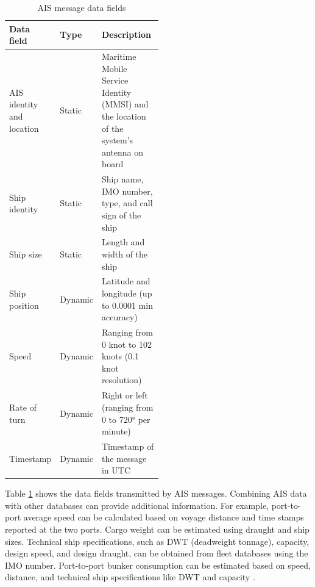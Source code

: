 \begin{table}[ht]
    \centering
    \begin{tabular}{|l|l|p{0.5\linewidth}|}
        \hline
        \textbf{Data field}       & \textbf{Type} & \textbf{Description}                                                                      \\
        \hline
        AIS identity and location & Static        & Maritime Mobile Service Identity (MMSI) and the location of the system's antenna on board \\
        \hline
        Ship identity             & Static        & Ship name, IMO number, type, and call sign of the ship                                    \\
        \hline
        Ship size                 & Static        & Length and width of the ship                                                              \\
        \hline
        Ship position             & Dynamic       & Latitude and longitude (up to 0.0001 min accuracy)                                        \\
        \hline
        Speed                     & Dynamic       & Ranging from 0 knot to 102 knots (0.1 knot resolution)                                    \\
        \hline
        Rate of turn              & Dynamic       & Right or left (ranging from 0 to 720° per minute)                                         \\
        \hline
        Timestamp                 & Dynamic       & Timestamp of the message in UTC                                                           \\
        \hline
    \end{tabular}
    \caption{AIS message data fields \autocite{perez2009automatic}}
    \label{tab:ais_message}
\end{table}


Table \ref{tab:ais_message} shows the data fields transmitted by AIS messages.
Combining AIS data with other databases can provide additional information.
For example, port-to-port average speed can be calculated based on voyage distance and time stamps reported at the two ports.
Cargo weight can be estimated using draught and ship sizes. Technical ship specifications, such as DWT (deadweight tonnage), capacity, design speed, and design draught, can be obtained from fleet databases using the IMO number.
Port-to-port bunker consumption can be estimated based on speed, distance, and technical ship specifications like DWT and capacity \autocite{yang2019big}.



